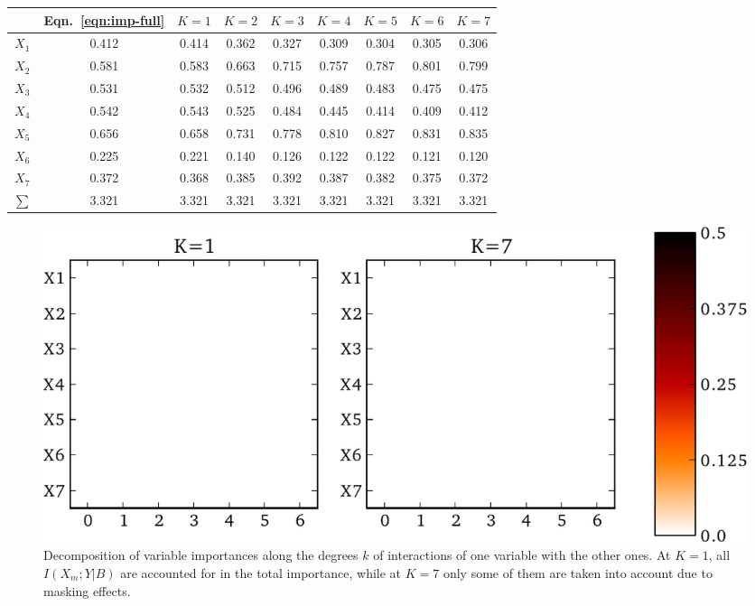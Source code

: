 \documentclass{article}
\begin{document}
\begin{table}
    \begin{tabular}{ c | c c c c c c c c }
    \hline
        & Eqn.~\ref{eqn:imp-full} & $K=1$ & $K=2$ & $K=3$ & $K=4$ & $K=5$ & $K=6$ & $K=7$ \\
    \hline
    $X_1$ & 0.412 & 0.414 & 0.362 & 0.327 & 0.309 & 0.304 & 0.305 & 0.306\\
    $X_2$ & 0.581 & 0.583 & 0.663 & 0.715 & 0.757 & 0.787 & 0.801 & 0.799\\
    $X_3$ & 0.531 & 0.532 & 0.512 & 0.496 & 0.489 & 0.483 & 0.475 & 0.475\\
    $X_4$ & 0.542 & 0.543 & 0.525 & 0.484 & 0.445 & 0.414 & 0.409 & 0.412\\
    $X_5$ & 0.656 & 0.658 & 0.731 & 0.778 & 0.810 & 0.827 & 0.831 & 0.835\\
    $X_6$ & 0.225 & 0.221 & 0.140 & 0.126 & 0.122 & 0.122 & 0.121 & 0.120\\
    $X_7$ & 0.372 & 0.368 & 0.385 & 0.392 & 0.387 & 0.382 & 0.375 & 0.372\\
    \hline
    $\sum$& 3.321 & 3.321 & 3.321 & 3.321 & 3.321 & 3.321 & 3.321 & 3.321\\
    \hline
    \end{tabular}
    \label{table:imp}
\end{table}

\begin{figure}
    \centering
    \includegraphics[scale=0.5]{imp-led-type1.pdf}
    \caption{Decomposition of variable importances along the degrees $k$ of interactions of one variable with the other ones. At $K=1$, all $I(X_m;Y|B)$ are accounted for in the total importance, while at $K=7$ only some of them are taken into account due to masking effects.}
    \label{fig:decomposition}
\end{figure}
\end{document}
